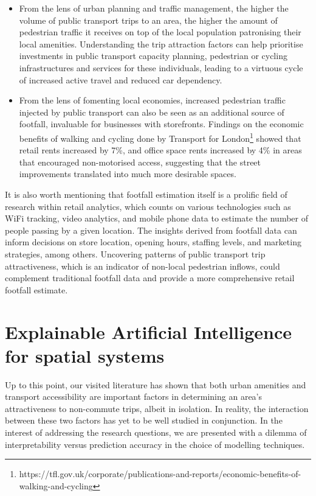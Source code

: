 \begin{itemize}
    \setlength\itemsep{0em}
    \item From the lens of urban planning and traffic management, the higher the volume of public transport trips to an area, the higher the amount of pedestrian traffic it receives on top of the local population patronising their local amenities. Understanding the trip attraction factors can help prioritise investments in public transport capacity planning, pedestrian or cycling infrastructures and services for these individuals, leading to a virtuous cycle of increased active travel and reduced car dependency.
    \item From the lens of fomenting local economies, increased pedestrian traffic injected by public transport can also be seen as an additional source of footfall, invaluable for businesses with storefronts. Findings on the economic benefits of walking and cycling done by Transport for London\footnote{https://tfl.gov.uk/corporate/publications-and-reports/economic-benefits-of-walking-and-cycling} showed that retail rents increased by 7\%, and office space rents increased by 4\% in areas that encouraged non-motorised access, suggesting that the street improvements translated into much more desirable spaces.
\end{itemize}

It is also worth mentioning that footfall estimation itself is a prolific field of research within retail analytics, which counts on various technologies such as WiFi tracking, video analytics, and mobile phone data to estimate the number of people passing by a given location. The insights derived from footfall data can inform decisions on store location, opening hours, staffing levels, and marketing strategies, among others. Uncovering patterns of public transport trip attractiveness, which is an indicator of non-local pedestrian inflows, could complement traditional footfall data and provide a more comprehensive retail footfall estimate.

\section{Explainable Artificial Intelligence for spatial systems}

Up to this point, our visited literature has shown that both urban amenities and transport accessibility are important factors in determining an area's attractiveness to non-commute trips, albeit in isolation. In reality, the interaction between these two factors has yet to be well studied in conjunction. In the interest of addressing the research questions, we are presented with a dilemma of interpretability versus prediction accuracy in the choice of modelling techniques.

